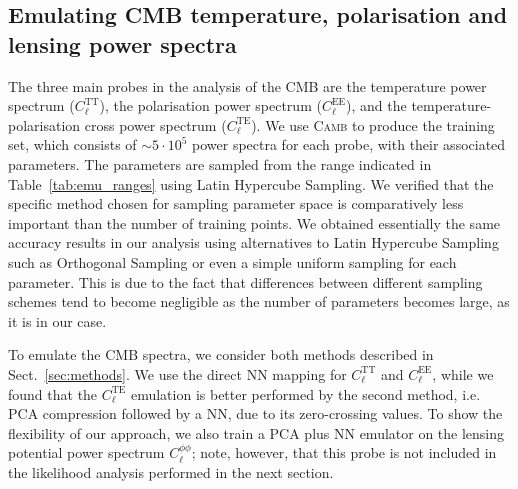 \documentclass[fleqn,usenatbib]{mnras}
\begin{document}
\subsection{Emulating CMB temperature, polarisation and lensing power spectra}
The three main probes in the analysis of the CMB are the temperature power spectrum ($C_{\ell}^{\textrm{TT}}$), the polarisation power spectrum ($C_{\ell}^{\textrm{EE}}$), and the temperature-polarisation cross power spectrum ($C_{\ell}^{\textrm{TE}}$). We use \textsc{Camb} to produce the training set, which consists of $\sim 5 \cdot 10^5$ power spectra for each probe, with their associated parameters. The parameters are sampled from the range indicated in Table~\ref{tab:emu_ranges} using Latin Hypercube Sampling. We verified that the specific method chosen for sampling parameter space is comparatively less important than the number of training points. We obtained essentially the same accuracy results in our analysis using alternatives to Latin Hypercube Sampling such as Orthogonal Sampling \citep{Owen92} or even a simple uniform sampling for each parameter. This is due to the fact that differences between different sampling schemes tend to become negligible as the number of parameters becomes large, as it is in our case.

To emulate the CMB spectra, we consider both methods described in Sect.~\ref{sec:methods}. We use the direct NN mapping for $C_{\ell}^{\textrm{TT}}$ and $C_{\ell}^{\textrm{EE}}$, while we  found that the $C_{\ell}^{\textrm{TE}}$ emulation is better performed by the second method, i.e. PCA compression followed by a NN, due to its zero-crossing values. To show the flexibility of our approach, we also train a PCA plus NN emulator on the lensing potential power spectrum $C_{\ell}^{\phi \phi}$; note, however, that this probe is not included in the likelihood analysis performed in the next section.
\end{document}
